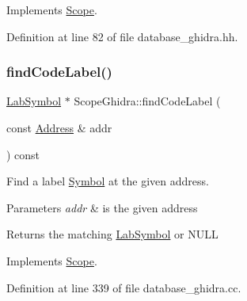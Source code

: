 Implements \mbox{\hyperlink{class_scope_ab679fe786be2fb949af78054cb2041a8}{Scope}}.



Definition at line 82 of file database\+\_\+ghidra.\+hh.

\mbox{\label{class_scope_ghidra_a81328af0bc4954612d1e107e592a246a}} 
\subsubsection{\texorpdfstring{findCodeLabel()}{findCodeLabel()}}
{\footnotesize\ttfamily \mbox{\hyperlink{class_lab_symbol}{Lab\+Symbol}} $\ast$ Scope\+Ghidra\+::find\+Code\+Label (\begin{DoxyParamCaption}\item[{const \mbox{\hyperlink{class_address}{Address}} \&}]{addr }\end{DoxyParamCaption}) const\hspace{0.3cm}{\ttfamily [virtual]}}



Find a label \mbox{\hyperlink{class_symbol}{Symbol}} at the given address. 


\begin{DoxyParams}{Parameters}
{\em addr} & is the given address \\
\hline
\end{DoxyParams}
\begin{DoxyReturn}{Returns}
the matching \mbox{\hyperlink{class_lab_symbol}{Lab\+Symbol}} or N\+U\+LL 
\end{DoxyReturn}


Implements \mbox{\hyperlink{class_scope_af4bac52b9d64974b87432c0379cc38c6}{Scope}}.



Definition at line 339 of file database\+\_\+ghidra.\+cc.

